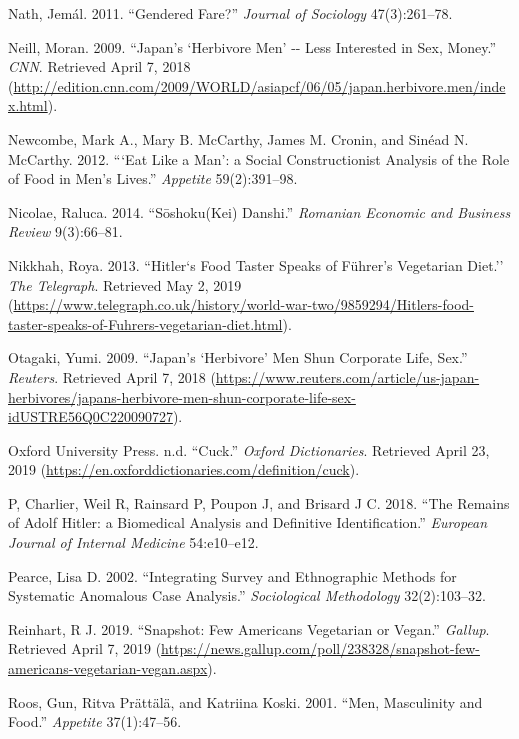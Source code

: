 \documentclass[twoside]{report}
\begin{document}
\hypertarget{nath}{Nath, Jemál. 2011. ``Gendered Fare?'' \emph{Journal of Sociology}
47(3):261--78.}

\hypertarget{neill}{Neill, Moran. 2009. ``Japan's `Herbivore Men' -\/- Less Interested in
Sex, Money.'' \emph{CNN}. Retrieved April 7, 2018
(\url{http://edition.cnn.com/2009/WORLD/asiapcf/06/05/japan.herbivore.men/index.html}).}

\hypertarget{newcombe}{Newcombe, Mark A., Mary B. McCarthy, James M. Cronin, and Sinéad N.
McCarthy. 2012. ```Eat Like a Man': a Social Constructionist Analysis of
the Role of Food in Men's Lives.'' \emph{Appetite} 59(2):391--98.}

\hypertarget{nicolae}{Nicolae, Raluca. 2014. ``Sōshoku(Kei) Danshi.'' \emph{Romanian Economic
and Business Review} 9(3):66--81.}

\hypertarget{nikkhah}{Nikkhah, Roya. 2013. ``Hitler`s Food Taster Speaks of Führer's
Vegetarian Diet.'' \emph{The Telegraph}. Retrieved May 2, 2019
(\url{https://www.telegraph.co.uk/history/world-war-two/9859294/Hitlers-food-taster-speaks-of-Fuhrers-vegetarian-diet.html}).}

\hypertarget{otagaki}{Otagaki, Yumi. 2009. ``Japan's `Herbivore' Men Shun Corporate Life,
Sex.'' \emph{Reuters}. Retrieved April 7, 2018
(\url{https://www.reuters.com/article/us-japan-herbivores/japans-herbivore-men-shun-corporate-life-sex-idUSTRE56Q0C220090727}).}

\hypertarget{oxford}{Oxford University Press. n.d. ``Cuck.'' \emph{Oxford Dictionaries}.
Retrieved April 23, 2019
(\url{https://en.oxforddictionaries.com/definition/cuck}).}

\hypertarget{p}{P, Charlier, Weil R, Rainsard P, Poupon J, and Brisard J C. 2018. ``The
Remains of Adolf Hitler: a Biomedical Analysis and Definitive
Identification.'' \emph{European Journal of Internal Medicine}
54:e10--e12.}

\hypertarget{pearce}{Pearce, Lisa D. 2002. ``Integrating Survey and Ethnographic Methods for
Systematic Anomalous Case Analysis.'' \emph{Sociological Methodology}
32(2):103--32.}

\hypertarget{reinhart}{Reinhart, R J. 2019. ``Snapshot: Few Americans Vegetarian or Vegan.''
\emph{Gallup}. Retrieved April 7, 2019
(\href{https://news.gallup.com/poll/238328/snapshot-few-americans-vegetarian-ve-gan.aspx}{https://news.gallup.com/poll/238328/snapshot-few-americans-vegetarian-vegan.aspx}).}

\hypertarget{roos}{Roos, Gun, Ritva Prättälä, and Katriina Koski. 2001. ``Men, Masculinity
and Food.'' \emph{Appetite} 37(1):47--56.}
\end{document}

